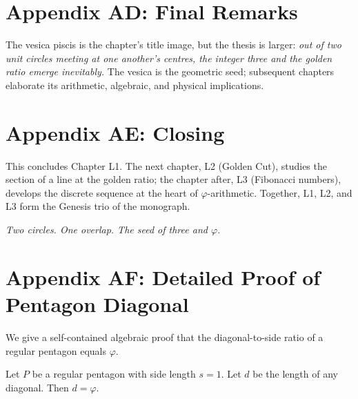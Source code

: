 \section*{Appendix AD: Final Remarks}
\label{fa_01:sec:01-app-AD}

The vesica piscis is the chapter's title image, but the thesis is
larger: \emph{out of two unit circles meeting at one another's centres,
the integer three and the golden ratio emerge inevitably.} The
vesica is the geometric seed; subsequent chapters elaborate its
arithmetic, algebraic, and physical implications.

\section*{Appendix AE: Closing}
\label{fa_01:sec:01-app-AE}

This concludes Chapter L1. The next chapter, L2 (Golden Cut), studies
the section of a line at the golden ratio; the chapter after, L3
(Fibonacci numbers), develops the discrete sequence at the heart of
$\varphi$-arithmetic. Together, L1, L2, and L3 form the Genesis trio
of the monograph.

\bigskip
\centerline{\textit{Two circles. One overlap. The seed of three and $\varphi$.}}
\bigskip



\section*{Appendix AF: Detailed Proof of Pentagon Diagonal}
\label{fa_01:sec:01-app-AF}

We give a self-contained algebraic proof that the diagonal-to-side
ratio of a regular pentagon equals $\varphi$.

\begin{theorem}
\label{thm:01-pentagon-alg}
Let $P$ be a regular pentagon with side length $s = 1$. Let $d$ be
the length of any diagonal. Then $d = \varphi$.
\end{theorem}

